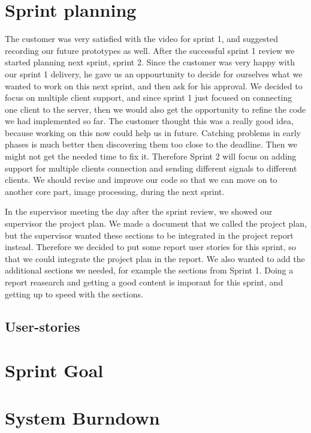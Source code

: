 \section{Sprint planning}

The customer was very satisfied with the video for sprint 1, and suggested recording our future prototypes as well. 
After the successful sprint 1 review we started planning next sprint, sprint 2. Since the customer was very happy with our sprint 1 delivery, he gave us an oppourtunity to decide for ourselves what we wanted to work on this next sprint, and then ask for his approval. 
We decided to focus on multiple client support, and since sprint 1 just focused on connecting one client to the server, then we would also get the opportunity to refine the code we had implemented so far. The customer thought this was a really good idea, because working on this now could help us in future. Catching problems in early phases is much better then discovering them too close to the deadline. Then we might not get the needed time to fix it. Therefore Sprint 2 will focus on adding support for multiple clients connection and sending different signals to different clients. We should revise and improve our code so that we can move on to another core part, image processing, during the next sprint.

In the supervisor meeting the day after the sprint review, we showed our supervisor the project plan. 
We made a document that we called the project plan, but the supervisor wanted these sections to be integrated in the project report instead. Therefore we decided to put some report user stories for this sprint, so that we could integrate the project plan in the report. We also wanted to add the additional sections we needed, for example the sections from Sprint 1. 
Doing a report reasearch and getting a good content is imporant for this sprint, and getting up to speed with the sections. 

\subsection{User-stories}

\section{Sprint Goal}
\section{System Burndown}
